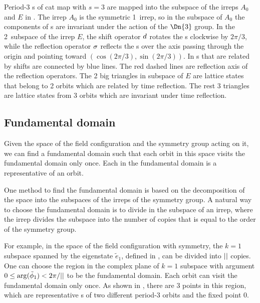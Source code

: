 Period-3 {\lattstate}s of cat map with $s=3$ are mapped into the subspace
of the irreps $A_0$ and $E$ in .
The irrep $A_0$ is the symmetric 1\dmn\ irrep, so in the subspace of $A_0$ the components
of {\lattstate}s are invariant under the action of the $\Dn{3}$ group.
In the 2\dmn\ subspace of the irrep $E$, the shift operator $d$ rotates the
{\lattstate}s clockwise by $2\pi/3$, while the reflection operator $\sigma$ reflects the {\lattstate}s
over the axis passing through the origin and pointing toward $(\cos(2\pi/3),\sin(2\pi/3))$.
In 
{\lattstate}s that are related by shifts are connected by blue lines.
The red dashed lines are reflection axis of the reflection operators.
The 2 big triangles in  subspace of $E$ are lattice states
that belong to 2 orbits which are related by time reflection. The rest 3 triangles
are lattice states from 3 orbits which are invariant under time reflection.

\subsection{Fundamental domain} %

Given the space of the field configuration and the symmetry group acting on it,
we can find a fundamental domain such that each orbit in this space
visits the fundamental domain only once.
Each {\lattstate} in the fundamental domain is a representative {\lattstate} of an
orbit.

One method to find the fundamental domain is based on the decomposition
of the space into the subspaces of the irreps of the symmetry group.
A natural way to choose the fundamental domain is to divide in the
subspace of an irrep, where the irrep divides the subspace into the number
of copies that is equal to the order of the symmetry group.

For example, in the space of the field configuration with \Cn{\cl{}} symmetry, the $k=1$ subspace
spanned by the eigenstate $\tilde{e}_1$, defined in , can be divided
into ${||}$ copies. One can choose the region in the complex plane of $k=1$ subspace
with argument $0\leq\arg(\tilde{\phi}_{1})<2\pi/{||}$ to be the fundamental domain.
Each orbit can visit the fundamental domain only once. As shown in ,
there are 3 points in this region, which are representative {\lattstate}s of two different
period-3 orbits and the fixed point $0$.

